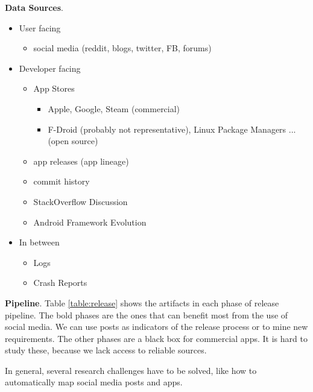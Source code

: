 \documentclass[a4paper]{article}
\newcommand{\smallsection}[1]{\noindent \textbf{#1}. }
\begin{document}
\smallsection{Data Sources}
\begin{itemize}
    \tightlist
    \item User facing
        \begin{itemize}
            \tightlist
            \item social media (reddit, blogs, twitter, FB, forums)
        \end{itemize}
    \item Developer facing
        \begin{itemize}
            \tightlist
            \item App Stores
                \begin{itemize}
                    \tightlist
                    \item Apple, Google, Steam (commercial)
                    \item F-Droid (probably not representative), Linux Package Managers ... (open source)
                \end{itemize}
            \item app releases (app lineage)
            \item commit history
            \item StackOverflow Discussion
            \item Android Framework Evolution
        \end{itemize}
    \item In between
        \begin{itemize}
            \tightlist
            \item Logs
            \item Crash Reports
        \end{itemize}
\end{itemize}

\smallsection{Pipeline} Table \ref{table:release} shows the artifacts in each phase of release pipeline. The bold phases are the ones that can benefit most from the use of social media. We can use posts as indicators of the release process or to mine new requirements. The other phases are a black box for commercial apps. It is hard to study these, because we lack access to reliable sources.

In general, several research challenges have to be solved, like how to automatically map social media posts and apps.
\end{document}

